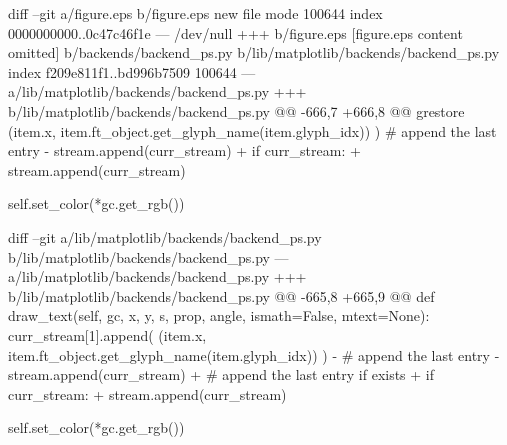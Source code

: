 {\begin{observationbox}
\begin{CodeVerbatim}[breaklines=true, breakanywhere=true]
diff --git a/figure.eps b/figure.eps
new file mode 100644
index 0000000000..0c47c46f1e
--- /dev/null
+++ b/figure.eps
[figure.eps content omitted]
b/backends/backend_ps.py b/lib/matplotlib/backends/backend_ps.py
index f209e811f1..bd996b7509 100644
--- a/lib/matplotlib/backends/backend_ps.py
+++ b/lib/matplotlib/backends/backend_ps.py
@@ -666,7 +666,8 @@ grestore
                     (item.x, item.ft_object.get_glyph_name(item.glyph_idx))
                 )
             # append the last entry
-            stream.append(curr_stream)
+            if curr_stream:
+                stream.append(curr_stream)
 
         self.set_color(*gc.get_rgb())
 
\end{CodeVerbatim}
\end{observationbox}
\begin{goldpatchbox}
\begin{CodeVerbatim}[breaklines=true, breakanywhere=true]
diff --git a/lib/matplotlib/backends/backend_ps.py b/lib/matplotlib/backends/backend_ps.py
--- a/lib/matplotlib/backends/backend_ps.py
+++ b/lib/matplotlib/backends/backend_ps.py
@@ -665,8 +665,9 @@ def draw_text(self, gc, x, y, s, prop, angle, ismath=False, mtext=None):
                 curr_stream[1].append(
                     (item.x, item.ft_object.get_glyph_name(item.glyph_idx))
                 )
-            # append the last entry
-            stream.append(curr_stream)
+            # append the last entry if exists
+            if curr_stream:
+                stream.append(curr_stream)
 
         self.set_color(*gc.get_rgb())
 
\end{CodeVerbatim}
\end{goldpatchbox}
}